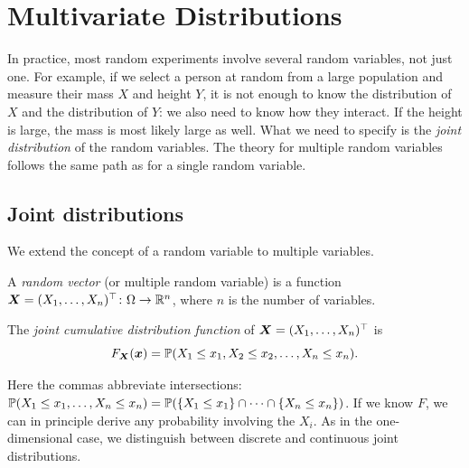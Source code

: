 \chapter{Multivariate Distributions}\label{ch:multivariate-distributions}



In practice, most random experiments involve several random variables, not just one. For example, if we select a person at random from a large population and measure their mass $X$ and height $Y$, it is not enough to know the distribution of $X$ and the distribution of $Y$: we also need to know how they interact. If the height is large, the mass is most likely large as well. What we need to specify is the \emph{joint distribution} of the random variables. The theory for multiple random variables follows the same path as for a single random variable.

\section{Joint distributions}\label{sec:joint-distributions}

We extend the concept of a random variable to multiple variables.

\begin{definition}\label{def:random-vector}
A \emph{random vector} (or multiple random variable) is a function $\bm{X} = (X_1, \ldots, X_n)^{\top} \colon \Omega \to \mathbb{R}^n$, where $n$ is the number of variables.
\end{definition}

\begin{definition}\label{def:joint-cdf}
The \emph{joint cumulative distribution function} of $\bm{X} = (X_1, \ldots, X_n)^{\top}$ is
\[
  F_{\bm{X}}(\bm{x}) = \mathbb{P}(X_1 \le x_1, X_2 \le x_2, \ldots, X_n \le x_n).
\]
\end{definition}

Here the commas abbreviate intersections: $\mathbb{P}(X_1 \le x_1, \ldots, X_n \le x_n) = \mathbb{P}(\left\{ X_1 \le x_1 \right\} \cap \cdots \cap \left\{ X_n \le x_n \right\})$. If we know $F$, we can in principle derive any probability involving the $X_i$. As in the one-dimensional case, we distinguish between discrete and continuous joint distributions.

